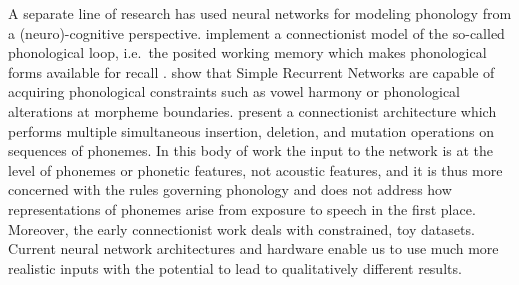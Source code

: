 A separate line of research has used neural networks for modeling
phonology from a (neuro)-cognitive perspective.
\citet{burgess1999memory} implement a connectionist model of the
so-called phonological loop, i.e.\ the posited working memory which
makes phonological forms available for recall
\citep{baddeley1974working}.  \citet{gasser1989networks} show that
Simple Recurrent Networks are capable of acquiring phonological
constraints such as vowel harmony or phonological alterations at
morpheme boundaries. \citet{touretzky1989computational} present a
connectionist architecture which performs multiple simultaneous insertion,
deletion, and mutation operations on sequences of phonemes. In this body of
work the input to the network is at the level of phonemes or phonetic
features, not acoustic features, and it is thus more concerned with the
rules governing phonology and does not address how representations of
phonemes arise from exposure to speech in the first place. Moreover,
the early connectionist work deals with constrained, 
toy datasets. Current neural network architectures and hardware enable us
to use much more realistic inputs with the potential to lead to
qualitatively different results.


